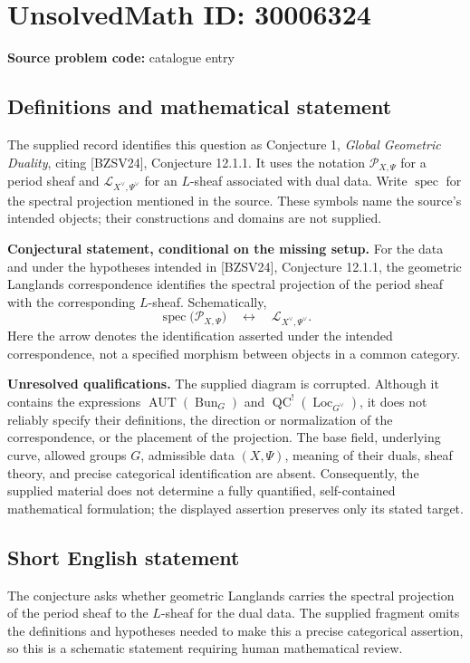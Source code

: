 \documentclass[11pt]{article}
\begin{document}
\section*{UnsolvedMath ID: 30006324}
\textbf{Source problem code:} catalogue entry
\subsection{Definitions and mathematical statement}
The supplied record identifies this question as Conjecture 1, \emph{Global Geometric Duality}, citing [BZSV24], Conjecture 12.1.1. It uses the notation \(\mathcal P_{X,\Psi}\) for a period sheaf and \(\mathcal L_{X^\vee,\Psi^\vee}\) for an \(L\)-sheaf associated with dual data. Write \(\operatorname{spec}\) for the spectral projection mentioned in the source. These symbols name the source's intended objects; their constructions and domains are not supplied.

\textbf{Conjectural statement, conditional on the missing setup.} For the data and under the hypotheses intended in [BZSV24], Conjecture 12.1.1, the geometric Langlands correspondence identifies the spectral projection of the period sheaf with the corresponding \(L\)-sheaf. Schematically,
\[
\operatorname{spec}\bigl(\mathcal P_{X,\Psi}\bigr)
\quad\longleftrightarrow\quad
\mathcal L_{X^\vee,\Psi^\vee}.
\]
Here the arrow denotes the identification asserted under the intended correspondence, not a specified morphism between objects in a common category.

\textbf{Unresolved qualifications.} The supplied diagram is corrupted. Although it contains the expressions \(\operatorname{AUT}(\operatorname{Bun}_G)\) and \(\operatorname{QC}^{!}(\operatorname{Loc}_{G^\vee})\), it does not reliably specify their definitions, the direction or normalization of the correspondence, or the placement of the projection. The base field, underlying curve, allowed groups \(G\), admissible data \((X,\Psi)\), meaning of their duals, sheaf theory, and precise categorical identification are absent. Consequently, the supplied material does not determine a fully quantified, self-contained mathematical formulation; the displayed assertion preserves only its stated target.
\subsection{Short English statement}
The conjecture asks whether geometric Langlands carries the spectral projection of the period sheaf to the \(L\)-sheaf for the dual data. The supplied fragment omits the definitions and hypotheses needed to make this a precise categorical assertion, so this is a schematic statement requiring human mathematical review.
\end{document}
